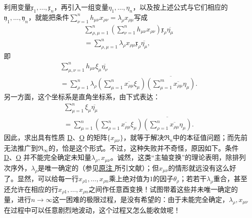 \documentclass[fontsize=13pt,twoside,openany,headings=normal,parskip=false,bookmarkpackage=false,DIV=calc]{scrbook}
\begin{document}
\hypertarget{origpage-57}{}\label{origpage-57}利用变量$\mathfrak{x}_1,\allowbreak \ldots,\allowbreak \mathfrak{x}_n$，再引入一组变量$\eta_1,\allowbreak \ldots,\allowbreak \eta_n$，以及按上述公式与它们相应的$\mathfrak{y}_1,\allowbreak \ldots,\allowbreak \mathfrak{y}_n$，就能把条件$\sum_{\nu=1}^n h_{\mu\nu}x_{\rho\nu}=\lambda_\rho x_{\rho\mu}$写成
\begin{align*}
&\sum_{\rho,\mu=1}^n\left(\sum_{\nu=1}^n h_{\mu\nu}x_{\rho\nu}\right)\mathfrak{x}_\rho\overline{\eta_\mu}\\
&=\sum_{\rho,\mu=1}^n\lambda_\rho x_{\rho\mu}\mathfrak{x}_\rho\overline{\eta_\mu},
\end{align*}
即
\begin{equation}
\begin{aligned}
&\sum_{\mu,\nu=1}^n h_{\mu\nu}\xi_\mu\overline{\eta_\nu}\\
&=\sum_{\rho=1}^n\lambda_\rho
\left(\sum_{\mu=1}^n\overline{x_{\rho\mu}}\xi_\mu\right)
\overline{\left(\sum_{\mu=1}^m\overline{x_{\rho\mu}}\eta_\mu\right)}.
\end{aligned}
\tag{D}\label{eq:II.7.D}
\end{equation}
另一方面，这个坐标系是直角坐标系，由下式表达：
\begin{equation}
\begin{aligned}
&\sum_{\mu=1}^n\xi_\mu\overline{\eta_\mu}\\
&=\sum_{\mu=1}^n
\left(\sum_{\rho=1}^n\overline{x_{\rho\mu}}\xi_\mu\right)
\overline{\left(\sum_{\rho=1}^n\overline{x_{\rho\mu}}\eta_\mu\right)}.
\end{aligned}
\tag{O}\label{eq:II.7.O}
\end{equation}
因此，求出具有性质 \hyperref[eq:II.7.D]{D}、\hyperref[eq:II.7.O]{O} 的矩阵$\{x_{\mu\nu}\}$，就等于解决$\mathfrak{R}_n$中的本征值问题；而先前无法推广到$\mathfrak{R}_\infty$的，恰是这个形式。不过，这种失败并不奇怪，原因如下。条件 \hyperref[eq:II.7.D]{D}、\hyperref[eq:II.7.O]{O} 并不能完全确定未知量$\lambda_\rho,\allowbreak x_{\mu\nu}$。诚然，这类“主轴变换”的理论表明，除排列次序外，$\lambda_\rho$是唯一确定的（参见\CJKglue \hyperlink{note-71}{原注 } 所引文献）；但$x_{\mu\nu}$的情形就远没有这么好了。显然，可以给每一行$x_{\rho1},\allowbreak \ldots,\allowbreak x_{\rho n}$乘上绝对值为$1$的因子$\theta_\rho$；若若干$\lambda_\rho$重合，甚至还允许在相应的行$x_{\rho1},\allowbreak \ldots,\allowbreak x_{\rho n}$之间作任意酉变换！试图带着这些并未唯一确定的量，进行$n\to\infty$这一困难的极限过程，是没有希望的：由于未能完全确定，$\lambda_\rho,\allowbreak x_{\mu\nu}$在过程中可以任意剧烈地波动，这个过程又怎么能收敛呢！
\end{document}
